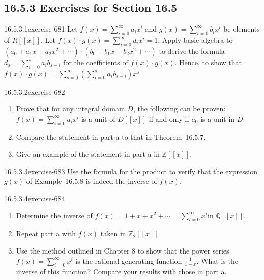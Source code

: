 \documentclass[twoside,10pt,]{book}
\numberwithin{equation}{section}
\begin{document}
\subsection*{16.5.3 Exercises for Section 16.5}
\begin{divisionsolution}{16.5.3.1}{}{exercise-681}%
\hypertarget{p-6091}{}%
Let \(f(x)=\sum_{i=0}^{\infty} a_i x^i\)  and  \(g(x)=\sum_{i=0}^{\infty } b_i x^i\) be elements of \(R[[x]]\).  Let  \(f(x) \cdot  g(x) =\sum_{i=0}^{\infty } d_i x^i= 1\).   Apply basic algebra to \(\left(a_0 + a_1 x+a_2 x^2+ \cdots \right)\cdot \left(b_0 + b_1 x+b_2 x^2+ \cdots \right)\) to derive the formula \(d_s= \sum_{i=0}^s a_i b_{s-i}\) for the coefficients of \(f(x) \cdot  g(x)\). Hence, to show that \(f(x) \cdot  g(x) =\sum_{s=0}^{\infty } \left(\sum_{i=0}^s a_i b_{s-i}\right) x^s\)%
\end{divisionsolution}%
\begin{divisionsolution}{16.5.3.2}{}{exercise-682}%
\hypertarget{p-6092}{}%
\leavevmode%
\begin{enumerate}[label=(\alph*)]
\item\hypertarget{li-2690}{}\hypertarget{p-6093}{}%
Prove that for any integral domain \(D\), the following can be proven: \(f(x)=\sum_{i=0}^{\infty } a_i x^i\) is a unit of \(D[[x]]\) if and only if \(a_0\) is a unit in \(D\).%
\item\hypertarget{li-2691}{}\hypertarget{p-6094}{}%
Compare the statement in part a to that in Theorem~16.5.7.%
\item\hypertarget{li-2692}{}\hypertarget{p-6095}{}%
Give an example of the statement in part a in \(\mathbb{Z}[[x]]\).%
\end{enumerate}
%
\end{divisionsolution}%
\begin{divisionsolution}{16.5.3.3}{}{exercise-683}%
\hypertarget{p-6096}{}%
Use the formula for the product to verify that the expression \(g(x)\) of Example~16.5.8 is indeed the inverse of \(f(x)\).%
\end{divisionsolution}%
\begin{divisionsolution}{16.5.3.4}{}{exercise-684}%
\hypertarget{p-6097}{}%
\leavevmode%
\begin{enumerate}[label=(\alph*)]
\item\hypertarget{li-2693}{}\hypertarget{p-6098}{}%
Determine the inverse of \(f(x) = 1 + x + x^2 + \cdots  = \sum_{i=0}^{\infty } x^i\)in \(\mathbb{Q}[[x]]\).%
\item\hypertarget{li-2694}{}\hypertarget{p-6099}{}%
Repeat part a with \(f(x)\) taken in \(\mathbb{Z}_2[[x]]\).%
\item\hypertarget{li-2695}{}\hypertarget{p-6100}{}%
Use the method outlined in Chapter 8 to show that the power series \(f(x) = \sum_{i=0}^{\infty } x^i\) is the rational generating function \(\frac{1}{1-x}\). What is the inverse of this function? Compare your results with those in part a.%
\end{enumerate}
%
\end{divisionsolution}%
\end{document}
